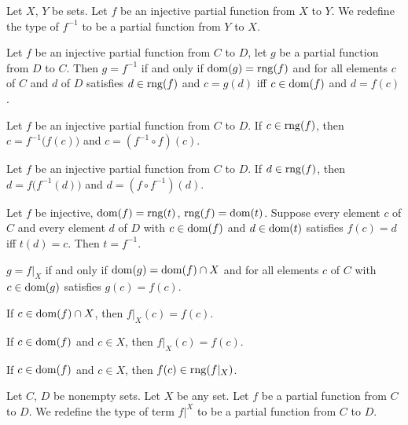 \documentclass{article}
\begin{document}
\begin{definition}
Let $X$, $Y$ be sets. Let $f$ be an injective partial function from $X$
to $Y$. We redefine the type of $f^{-1}$ to be a partial function from
$Y$ to $X$.
\end{definition}

\begin{thm}
\item\label{partfun2:11} Let $f$ be an injective partial function from
  $C$ to $D$, let $g$ be a partial function from $D$ to $C$.
  Then $g=f^{-1}$ if and only if $\operatorname{dom}(g)=\operatorname{rng}(f)$ and for all elements
  $c$ of $C$ and $d$ of $D$ satisfies $d\in\operatorname{rng}(f)$ and $c=g(d)$ iff
  $c\in\operatorname{dom}(f)$ and $d=f(c)$.
\item\label{partfun2:12} Let $f$ be an injective partial function from
  $C$ to $D$. If $c\in\operatorname{rng}(f)$, then $c=f^{-1}\bigl(f(c)\bigr)$ and
  $c=(f^{-1}\circ f)(c)$.
\item\label{partfun2:13} Let $f$ be an injective partial function from
  $C$ to $D$. If $d\in\operatorname{rng}(f)$, then $d=f\bigl(f^{-1}(d)\bigr)$ and
  $d=(f\circ f^{-1})(d)$.
\item\label{partfun2:14} Let $f$ be injective, $\operatorname{dom}(f)=\operatorname{rng}(t)$,
  $\operatorname{rng}(f)=\operatorname{dom}(t)$. Suppose every element $c$ of $C$ and every element
  $d$ of $D$ with $c\in\operatorname{dom}(f)$ and $d\in\operatorname{dom}(t)$ satisfies $f(c)=d$ iff $t(d)=c$.
  Then $t=f^{-1}$.
\item\label{partfun2:15} $g=f|_{X}$ if and only if $\operatorname{dom}(g)=\operatorname{dom}(f)\cap X$
  and for all elements $c$ of $C$ with $c\in\operatorname{dom}(g)$ satisfies $g(c)=f(c)$.
\item\label{partfun2:16} If $c\in\operatorname{dom}(f)\cap X$, then $f|_{X}(c)=f(c)$.
\item\label{partfun2:17} If $c\in\operatorname{dom}(f)$ and $c\in X$, then $f|_{X}(c)=f(c)$.
\item\label{partfun2:18} If $c\in\operatorname{dom}(f)$ and $c\in X$, then $f(c)\in\operatorname{rng}(f|_{X})$.
\end{thm}

\begin{definition}
Let $C$, $D$ be nonempty sets. Let $X$ be any set. Let $f$ be a partial
function from $C$ to $D$. We redefine the type of term $f|^{X}$ to be a
partial function from $C$ to $D$.
\end{definition}
\end{document}
